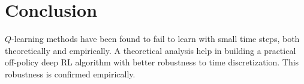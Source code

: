\section{Conclusion}

$Q$-learning methods have been found to fail to learn with small time
steps, both theoretically and empirically. A theoretical analysis
help in building a practical off-policy deep RL algorithm with better robustness to time
discretization. This robustness is confirmed empirically.
% 

